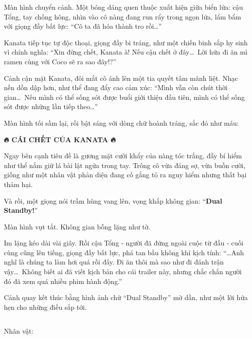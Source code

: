\documentclass[../main.tex]{subfiles}
\begin{document}

Màn hình chuyển cảnh. Một bóng dáng quen thuộc xuất hiện giữa biển lửa: cậu Tổng, tay chống hông, nhìn vào cô nàng đang run rẩy trong ngọn lửa, lẩm bẩm với giọng đầy bất lực: ``Cô ta đã hóa thành tro rồi\dots''

Kanata tiếp tục tự độc thoại, giọng đầy bi tráng, như một chiến binh sắp hy sinh vì chính nghĩa: ``Xin đừng chết, Kanata à! Nếu cậu chết ở đây\dots\ Lời hứa đi ăn mì ramen cùng với Coco sẽ ra sao đây!?''

Cảnh cận mặt Kanata, đôi mắt cô ánh lên một tia quyết tâm mãnh liệt. Nhạc nền dồn dập hơn, như thể đang đẩy cao cảm xúc: ``Mình vẫn còn chút thời gian\dots\ Nếu mình có thể sống sót được buổi giới thiệu đầu tiên, mình có thể sống sót được những lần tiếp theo\dots''


Màn hình tối sầm lại, rồi bật sáng với dòng chữ hoành tráng, sắc đỏ như máu:

\begin{center}
  \textbf{🔥 CÁI CHẾT CỦA KANATA 🔥}
\end{center}

Ngay bên cạnh tiêu đề là gương mặt cười khẩy của nàng tóc trắng, đầy bí hiểm như thể nắm giữ lá bài lật ngửa trong tay. Trông cô vừa đáng sợ, vừa buồn cười, giống như một nhân vật phản diện đang cố gắng tỏ ra nguy hiểm nhưng thất bại thảm hại.

Và rồi, một giọng nói trầm hùng vang lên, vọng khắp không gian: ``\textbf{Dual Standby!}''

Màn hình vụt tắt. Không gian bỗng lặng như tờ.

Im lặng kéo dài vài giây. Rồi cậu Tổng - người đã đứng ngoài cuộc từ đầu - cuối cùng cũng lên tiếng, giọng đầy bất lực, phá tan bầu không khí kịch tính: ``\dots Anh nghĩ là chúng ta làm hơi quá rồi đấy. Đi ăn thôi mà sao như đi đánh trận vậy\dots\ Không biết ai đã viết kịch bản cho cái trailer này, nhưng chắc chắn người đó đã xem quá nhiều phim hành động.''

Cảnh quay kết thúc bằng hình ảnh chữ ``Dual Standby'' mờ dần, như một lời hứa hẹn cho những điều sắp tới.

\newpage

\subsection*{\label{ep-S7.VII}}
\vspace{-4pt}
\begin{center}
  {\caviar\fontsize{12pt}{12pt}\selectfont Nhân vật:          }
\end{center}
\end{document}

